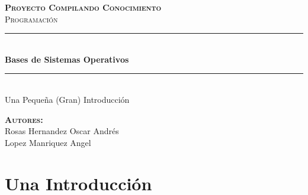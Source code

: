 \documentclass[12pt, fleqn]{report}                             %
\author{Oscar Andrés Rosas}                                     %
\begin{document}
\begin{titlepage}

    \center
    \textbf{\textsc{\Large Proyecto Compilando Conocimiento}}\\[1.0cm] 
    \textsc{\Large Programación}\\[1.0cm] 

    \rule{\linewidth}{0.5mm} \\[1.0cm]
        { \huge \bfseries Bases de Sistemas Operativos}\\[1.0cm] 
    \rule{\linewidth}{0.5mm} \\[2.0cm]
    
    {\LARGE Una Pequeña (Gran) Introducción}\\[7cm] 
    
    \begin{center} \large
    \textbf{\textsc{Autores:}}\\
        Rosas Hernandez Oscar Andrés \\
        Lopez Manriquez Angel
    \end{center}

    \vfill

\end{titlepage}

\tableofcontents{}
\label{sec:Index}

\clearpage




\part{Una Introducción}
\clearpage


\end{document}
